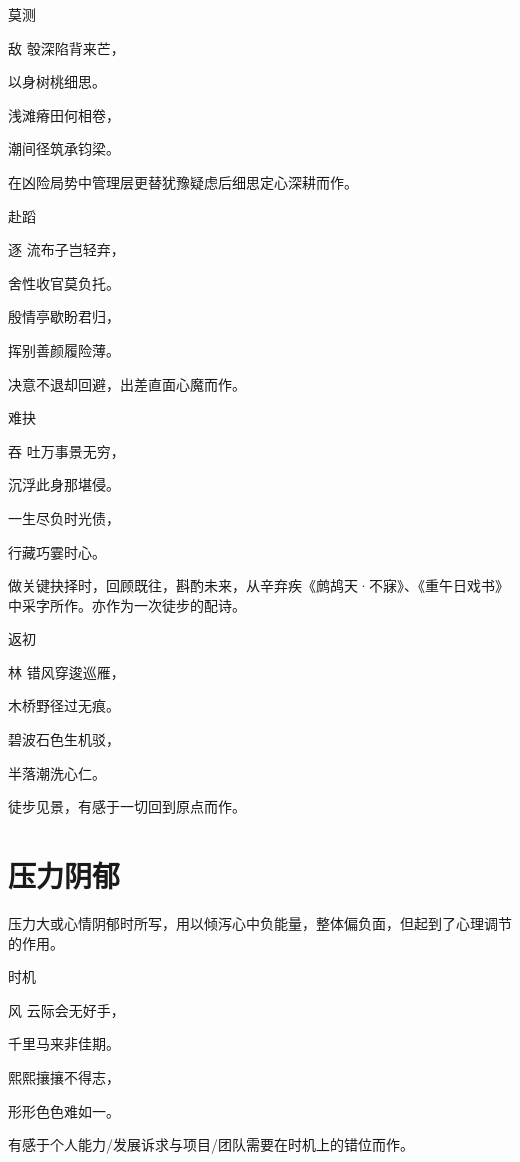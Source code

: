 \documentclass{article}
\newenvironment{poem}[3]{
\begin{minipage}{\textwidth}
\begin{pinyinscope}\begin{center}\Large\linespread{1.4}\selectfont #2\end{center}\end{pinyinscope}
\begin{pinyinscope}
	\begin{center}
	\Large\linespread{1.4}\rmfamily\selectfont #3
}{\end{center}
\end{pinyinscope}
\end{minipage}
}
\begin{document}
\begin{poem}{}{莫测}
敌彀深陷背来芒，

以身树桃细思{}。

浅滩瘠田何相卷，

潮间径筑承钧梁。
\end{poem}

在凶险局势中管理层更替犹豫疑虑后细思定心深耕而作。

\begin{poem}{}{赴蹈}
逐流布子岂轻弃，

舍性收官莫负托。

殷情亭歇盼君归，

挥别善颜履险薄。
\end{poem}

决意不退却回避，出差直面心魔而作。

\begin{poem}{}{难抉}
吞吐万事景无穷，

沉浮此身那堪侵。

一生尽负时光债，

行藏巧{}霎时心。
\end{poem}

做关键抉择时，回顾既往，斟酌未来，从辛弃疾《鹧鸪天·不寐》、《重午日戏书》中采字所作。亦作为一次徒步的配诗。

\begin{poem}{}{返初}
林错风穿逡巡雁，

木桥野径过无痕。

碧波石色生机驳，

半{}落潮洗心仁。
\end{poem}

徒步见景，有感于一切回到原点而作。

\section{压力阴郁}

压力大或心情阴郁时所写，用以倾泻心中负能量，整体偏负面，但起到了心理调节的作用。

\begin{poem}{}{时机}
风云际会无好手，

千里马来非佳期。

熙熙攘攘不得志，

形形色色难如一。
\end{poem}

有感于个人能力/发展诉求与项目/团队需要在时机上的错位而作。
\end{document}
